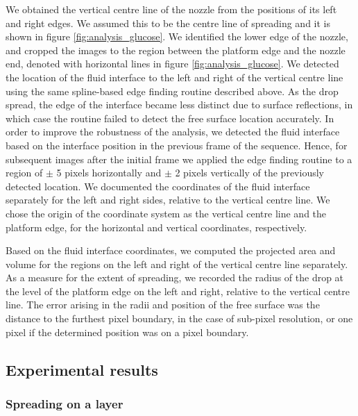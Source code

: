 \documentclass[aip,graphicx]{revtex4-1}
\begin{document}
We obtained the vertical centre line of the nozzle from the positions of its left and right edges. 
We assumed this to be the centre line of spreading and it is shown in figure \ref{fig:analysis_glucose}. 
We identified the lower edge of the nozzle, and cropped the images to the region between the platform edge and the nozzle end, denoted with horizontal lines in figure \ref{fig:analysis_glucose}. 
We detected the location of the fluid interface to the left and right of the vertical centre line using the same spline-based edge finding routine described above.
As the drop spread, the edge of the interface became less distinct due to surface reflections, in which case the routine failed to detect the free surface location accurately.
In order to improve the robustness of the analysis, we detected the fluid interface based on the interface position in the previous frame of the sequence.
Hence, for subsequent images after the initial frame we applied the edge finding routine to a region of $\pm$ 5 pixels horizontally and $\pm$ 2 pixels vertically of the previously detected location.
We documented the coordinates of the fluid interface separately for the left and right sides, relative to the vertical centre line.
We chose the origin of the coordinate system as the vertical centre line and the platform edge, for the horizontal and vertical coordinates, respectively.


Based on the fluid interface coordinates, we computed the projected area and volume for the regions on the left and right of the vertical centre line separately.
As a measure for the extent of spreading, we recorded the radius of the drop at the level of the platform edge on the left and right, relative to the vertical centre line. 
The error arising in the radii and position of the free surface was the distance to the furthest pixel boundary, in the case of sub-pixel resolution, or one pixel if the determined position was on a pixel boundary.


\subsection{Experimental results}

\subsubsection{Spreading on a layer}
\label{sec:expt_spreading_on_layer}
\end{document}
